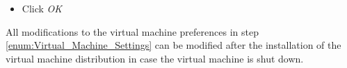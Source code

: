 \begin{enumerate}[noitemsep]
\begin{itemize}
\begin{itemize}
    \end{itemize}
  \item Click \textit{OK}
  \end{itemize}
\end{enumerate}

All modifications to the virtual machine preferences in step \ref{enum:Virtual_Machine_Settings} can be modified after the installation of the virtual machine distribution in case the virtual machine is shut down.




